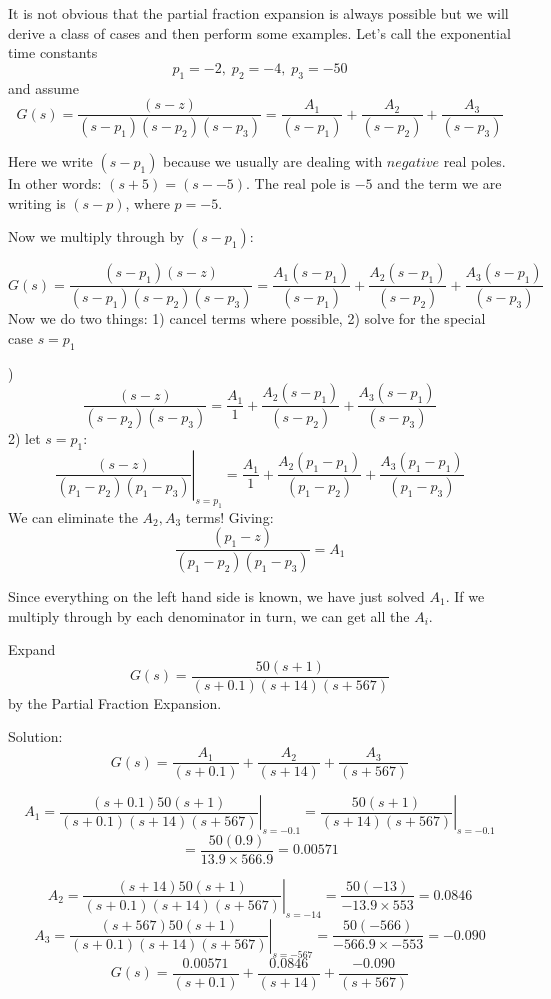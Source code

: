 It is not obvious that the partial fraction expansion is always possible but we will derive a class of cases and then perform some examples.
Let's call the exponential time constants
\[
p_1 = -2, \;p_2=-4,\; p_3 = -50
\]
and assume
\[
G(s) = \frac  {(s-z)}   {(s-p_1)(s-p_2)(s-p_3)} =  \frac{A_1}{(s-p_1)}+\frac{A_2}{(s-p_2)}+\frac{A_3}{(s-p_3)}
\]

Here we write $(s-p_1)$ because we usually are dealing with $negative$ real poles.   In other words: $(s+5) = (s - -5)$.   The real pole is $-5$ and the
term we are writing is $(s-p)$, where $p=-5$.

Now we multiply through by $(s-p_1)$:

\[
G(s) = \frac  {(s-p_1)(s-z)}   {(s-p_1)(s-p_2)(s-p_3)} =  \frac{A_1(s-p_1)}{(s-p_1)}+\frac{A_2(s-p_1)}{(s-p_2)}+\frac{A_3(s-p_1)}{(s-p_3)}
\]
Now we do two things:  1) cancel terms where possible,  2) solve for the special case $s=p_1$

)
\[
\frac  {(s-z)}   {(s-p_2)(s-p_3)} =  \frac{A_1}{1}+\frac{A_2(s-p_1)}{(s-p_2)}+\frac{A_3(s-p_1)}{(s-p_3)}
\]
2)
let $s=p_1$:
\[
\left . \frac  {(s-z)}   {(p_1-p_2)(p_1-p_3)} \right |_{s=p_1} =  \frac{A_1}{1}+\frac{A_2(p_1-p_1)}{(p_1-p_2)}+\frac{A_3(p_1-p_1)}{(p_1-p_3)}
\]
We can eliminate the $A_2,A_3$ terms! Giving:
\[
\frac  {(p_1-z)}   {(p_1-p_2)(p_1-p_3)} =  {A_1}
\]

Since everything on the left hand side is known,
we have just solved $A_1$.    If we multiply through by each denominator in turn, we can get all the $A_i$.




\begin{ExampleSmall}
Expand
\[
G(s) = \frac         {50(s+1)}                      {(s+0.1)(s+14)(s+567)}
\]
by the Partial Fraction Expansion.

\vspace{0.2in}
Solution:
\[
G(s) = \frac{A_1}{(s+0.1)} + \frac{A_2}{(s+14)} + \frac{A_3}{(s+567)}
\]

\[
A_1 = \left . \frac {(s+0.1)50(s+1)}{(s+0.1)(s+14)(s+567)} \right |_{s=-0.1} = \left . \frac {50(s+1)}  {(s+14)(s+567)}\right |_{s=-0.1}
\]
\[
= \frac {50(0.9)}{13.9\times566.9} = 0.00571
\]

\[
A_2 = \left . \frac {(s+14)50(s+1)}{(s+0.1)(s+14)(s+567)} \right |_{s=-14} = \frac {50(-13)}{-13.9 \times 553} = 0.0846
\]
\[
A_3 = \left . \frac {(s+567)50(s+1)}{(s+0.1)(s+14)(s+567)} \right |_{s=-567} = \frac {50(-566)}{-566.9 \times -553} = -0.090
\]
\vspace{0.15in}
\[
G(s) = \frac{0.00571}{(s+0.1)} + \frac{0.0846}{(s+14)} + \frac{-0.090}{(s+567)}
\]
\end{ExampleSmall}

